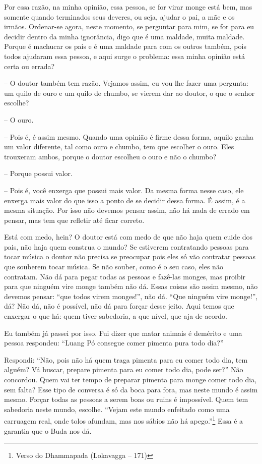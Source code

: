Por essa razão, na minha opinião, essa pessoa, se for virar monge
está bem, mas somente quando terminados seus deveres, ou seja, ajudar o
pai, a mãe e os irmãos. Ordenar-se agora, neste momento, se perguntar
para mim, se for para eu decidir dentro da minha ignorância, digo que é
uma maldade, muita maldade. Porque é machucar os pais e é uma maldade
para com os outros também, pois todos ajudaram essa pessoa, e aqui
surge o problema: essa minha opinião está certa ou errada?

-- O doutor também tem razão. Vejamos assim, eu vou lhe fazer uma
pergunta: um quilo de ouro e um quilo de chumbo, se vierem dar ao
doutor, o que o senhor escolhe? 

-- O ouro.

-- Pois é, é assim mesmo. Quando uma opinião é firme dessa forma,
aquilo ganha um valor diferente, tal como ouro e chumbo, tem que
escolher o ouro. Eles trouxeram ambos, porque o doutor escolheu o ouro
e não o chumbo?

-- Porque possui valor.

-- Pois é, você enxerga que possui mais valor. Da mesma forma nesse
caso, ele enxerga mais valor do que isso a ponto de se decidir dessa
forma. É assim, é a mesma situação. Por isso não devemos pensar assim,
não há nada de errado em pensar, mas tem que refletir até ficar
correto.

Está com medo, hein? O doutor está com medo de que não haja quem
cuide dos pais, não haja quem construa o mundo? Se estiverem
contratando pessoas para tocar música o doutor não precisa se preocupar
pois eles só vão contratar pessoas que souberem tocar música. Se não
souber, como é o seu caso, eles não contratam. Não dá para pegar todas
as pessoas e fazê-las monges, mas proibir para que ninguém vire monge
também não dá. Essas coisas são assim mesmo, não devemos pensar: “que
todos virem monges!”, não dá. “Que ninguém vire monge!”, dá? Não dá,
não é possível, não dá para forçar desse jeito. Aqui temos que enxergar
o que há: quem tiver sabedoria, a que nível, que aja de acordo.

Eu também já passei por isso. Fui dizer que matar animais é demérito
e uma pessoa respondeu: “Luang Pó consegue comer pimenta pura todo
dia?” 

Respondi: “Não, pois não há quem traga pimenta para eu comer todo
dia, tem alguém? Vá buscar, prepare pimenta para eu comer todo dia,
pode ser?” Não concordou. Quem vai ter tempo de preparar pimenta para
monge comer todo dia, sem falta? Esse tipo de conversa é só da boca
para fora, mas neste mundo é assim mesmo. Forçar todas as pessoas a
serem boas ou ruins é impossível. Quem tem sabedoria neste mundo,
escolhe. “Vejam este mundo enfeitado como uma carruagem real, onde
tolos afundam, mas nos sábios não há apego.”\footnote{Verso do
Dhammapada (Lokavagga – 171)} Essa é a garantia que o Buda nos dá. 

